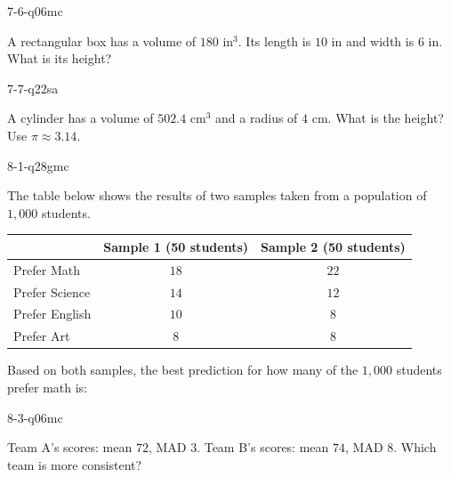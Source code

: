 \begin{practiceQuestion}{7-6-q06}{mc}
\begin{questionText}
A rectangular box has a volume of $180$ in$^3$. Its length is $10$ in and width is $6$ in. What is its height?
\end{questionText}
\end{practiceQuestion}

\begin{practiceQuestion}{7-7-q22}{sa}
\begin{questionText}
A cylinder has a volume of $502.4$ cm$^3$ and a radius of $4$ cm. What is the height? Use $\pi \approx 3.14$.
\end{questionText}
\end{practiceQuestion}

\begin{practiceQuestion}{8-1-q28}{gmc}
\begin{questionText}
The table below shows the results of two samples taken from a population of $1{,}000$ students.

\begin{center}
\begin{tabular}{|l|c|c|}
\hline
 & \textbf{Sample 1 (50 students)} & \textbf{Sample 2 (50 students)} \\
\hline
Prefer Math & $18$ & $22$ \\
\hline
Prefer Science & $14$ & $12$ \\
\hline
Prefer English & $10$ & $8$ \\
\hline
Prefer Art & $8$ & $8$ \\
\hline
\end{tabular}
\end{center}

Based on both samples, the best prediction for how many of the $1{,}000$ students prefer math is:
\end{questionText}
\end{practiceQuestion}

\begin{practiceQuestion}{8-3-q06}{mc}
\begin{questionText}
Team A's scores: mean $72$, MAD $3$. Team B's scores: mean $74$, MAD $8$. Which team is more consistent?
\end{questionText}
\end{practiceQuestion}

